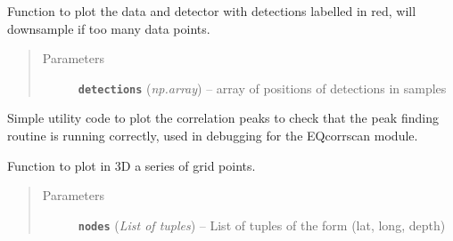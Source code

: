 \documentclass[a4paper,10pt,english]{sphinxmanual}
\begin{document}

\begin{fulllineitems}
\label{modules:EQcorrscan_plotting.detection_timeseries}
Function to plot the data and detector with detections labelled in red,
will downsample if too many data points.
\begin{quote}\begin{description}
\item[{Parameters}] \leavevmode
\textbf{\texttt{detections}} (\emph{np.array}) -- array of positions of detections in samples

\end{description}\end{quote}

\end{fulllineitems}


\begin{fulllineitems}
\label{modules:EQcorrscan_plotting.peaks_plot}
Simple utility code to plot the correlation peaks to check that the peak
finding routine is running correctly, used in debugging for the EQcorrscan
module.
\begin{quote}\begin{description}
\end{description}\end{quote}

\end{fulllineitems}


\begin{fulllineitems}
\label{modules:EQcorrscan_plotting.threeD_gridplot}
Function to plot in 3D a series of grid points.
\begin{quote}\begin{description}
\item[{Parameters}] \leavevmode
\textbf{\texttt{nodes}} (\emph{List of tuples}) -- List of tuples of the form (lat, long, depth)

\end{description}\end{quote}

\end{fulllineitems}
\end{document}

